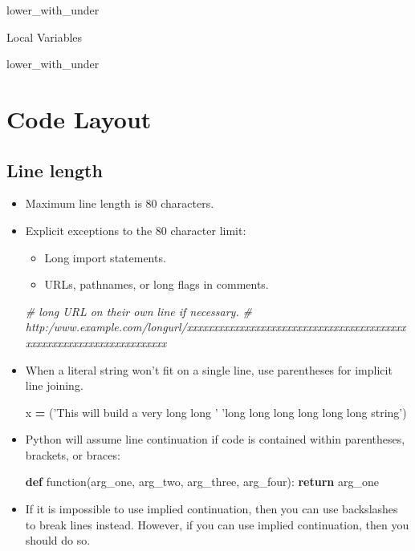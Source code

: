 \documentclass[
]{book}
\newenvironment{Shaded}{\begin{snugshade}}{\end{snugshade}}
\newcommand{\CommentTok}[1]{\textcolor[rgb]{0.56,0.35,0.01}{\textit{#1}}}
\newcommand{\ControlFlowTok}[1]{\textcolor[rgb]{0.13,0.29,0.53}{\textbf{#1}}}
\newcommand{\KeywordTok}[1]{\textcolor[rgb]{0.13,0.29,0.53}{\textbf{#1}}}
\newcommand{\NormalTok}[1]{#1}
\newcommand{\OperatorTok}[1]{\textcolor[rgb]{0.81,0.36,0.00}{\textbf{#1}}}
\newcommand{\StringTok}[1]{\textcolor[rgb]{0.31,0.60,0.02}{#1}}
\providecommand{\tightlist}{%
  \setlength{\itemsep}{0pt}\setlength{\parskip}{0pt}}
\begin{document}
lower\_with\_under

Local Variables

lower\_with\_under

\hypertarget{code-layout}{%
\section{Code Layout}\label{code-layout}}

\hypertarget{line-length-1}{%
\subsection{Line length}\label{line-length-1}}

\begin{itemize}
\item
  Maximum line length is 80 characters.
\item
  Explicit exceptions to the 80 character limit:

  \begin{itemize}
  \tightlist
  \item
    Long import statements.
  \item
    URLs, pathnames, or long flags in comments.
  \end{itemize}

\begin{Shaded}
\begin{Highlighting}[]
\CommentTok{# long URL on their own line if necessary. }
\CommentTok{# http:/www.example.com/longurl/xxxxxxxxxxxxxxxxxxxxxxxxxxxxxxxxxxxxxxxxxxxxxxxxxxxxxxxxxxxxxxxxxxxxx}
\end{Highlighting}
\end{Shaded}
\item
  When a literal string won't fit on a single line, use parentheses for implicit
  line joining.

\begin{Shaded}
\begin{Highlighting}[]
\NormalTok{x }\OperatorTok{=}\NormalTok{ (}\StringTok{'This will build a very long long '}
     \StringTok{'long long long long long long string'}\NormalTok{)}
\end{Highlighting}
\end{Shaded}
\item
  Python will assume line continuation if code is contained within parentheses,
  brackets, or braces:

\begin{Shaded}
\begin{Highlighting}[]
\KeywordTok{def}\NormalTok{ function(arg_one, arg_two,}
\NormalTok{             arg_three, arg_four):}
    \ControlFlowTok{return}\NormalTok{ arg_one}
\end{Highlighting}
\end{Shaded}
\item
  If it is impossible to use implied continuation, then you can use backslashes
  to break lines instead. However, if you can use implied continuation, then
  you should do so.


\end{itemize}
\end{document}
